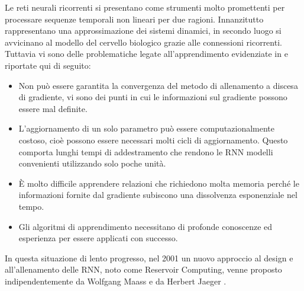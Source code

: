 Le reti neurali ricorrenti si presentano come strumenti molto promettenti per processare sequenze temporali non lineari per due ragioni. Innanzitutto rappresentano una approssimazione dei sistemi dinamici, in secondo luogo si avvicinano al modello del cervello biologico grazie alle connessioni ricorrenti.\\
Tuttavia vi sono delle problematiche legate all'apprendimento evidenziate in \cite{RCapproch:paper} e riportate qui di seguito:
\begin{itemize}
	\item Non può essere garantita la convergenza del metodo di allenamento a discesa di gradiente, vi sono dei punti in cui le informazioni sul gradiente possono essere mal definite.
	\item L'aggiornamento di un solo parametro può essere computazionalmente costoso,
	cioè possono essere necessari molti cicli di aggiornamento. Questo comporta lunghi tempi di addestramento che rendono le RNN modelli convenienti utilizzando solo poche unità.
	\item È molto difficile apprendere relazioni che richiedono molta memoria perché le informazioni fornite dal gradiente subiscono una dissolvenza esponenziale nel tempo.
	\item  Gli algoritmi di apprendimento necessitano di  profonde conoscenze ed esperienza per essere applicati con successo.
\end{itemize}
In questa situazione di lento progresso, nel 2001 un nuovo approccio al design e all'allenamento delle RNN, noto come Reservoir Computing, venne proposto indipendentemente da Wolfgang Maass \cite{w} e da Herbert Jaeger \cite{h}.





